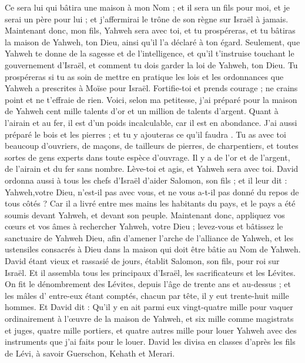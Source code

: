\begin{multicols}{2}
Ce sera lui qui bâtira une maison à mon Nom ; et il sera un fils pour moi, et je serai un père pour lui ; et j'affermirai le trône de son règne sur Israël à jamais.
Maintenant donc, mon fils, Yahweh sera avec toi, et tu prospéreras, et tu bâtiras la maison de Yahweh, ton Dieu, ainsi qu'il l’a déclaré à ton égard.
Seulement, que Yahweh te donne de la sagesse et de l'intelligence, et qu'il t'instruise touchant le gouvernement d'Israël, et comment tu dois garder la loi de Yahweh, ton Dieu.
Tu prospéreras si tu as soin de mettre en pratique les lois et les ordonnances que Yahweh a prescrites à Moïse pour Israël. Fortifie-toi et prends courage ; ne crains point et ne t'effraie de rien.
Voici, selon ma petitesse, j'ai préparé pour la maison de Yahweh cent mille talents d'or et un million de talents d'argent. Quant à l'airain et au fer, il est d'un poids incalculable, car il est en abondance. J'ai aussi préparé le bois et les pierres ; et tu y ajouteras ce qu'il faudra .
Tu as avec toi beaucoup d'ouvriers, de maçons, de tailleurs de pierres, de charpentiers, et toutes sortes de gens experts dans toute espèce d’ouvrage.
Il y a de l'or et de l'argent, de l'airain et du fer sans nombre. Lève-toi et agis, et Yahweh sera avec toi.
David ordonna aussi à tous les chefs d'Israël d'aider Salomon, son fils ; et il leur dit :
Yahweh,votre Dieu, n'est-il pas avec vous, et ne vous a-t-il pas donné du repos de tous côtés ? Car il a livré entre mes mains les habitants du pays, et le pays a été soumis devant Yahweh, et devant son peuple.
Maintenant donc, appliquez vos cœurs et vos âmes à rechercher Yahweh, votre Dieu ; levez-vous et bâtissez le sanctuaire de Yahweh Dieu, afin d’amener l’arche de l'alliance de Yahweh, et les ustensiles consacrés à Dieu dans la maison qui doit être bâtie au Nom de Yahweh.
\VerseOne{}David étant vieux et rassasié de jours, établit Salomon, son fils, pour roi sur Israël.
Et il assembla tous les principaux d'Israël, les sacrificateurs et les Lévites.
On fit le dénombrement des Lévites, depuis l'âge de trente ans et au-dessus ; et les mâles d' entre-eux étant comptés, chacun par tête, il y eut trente-huit mille hommes.
Et David dit : Qu’il y en ait  parmi eux vingt-quatre mille pour vaquer ordinairement à l'œuvre de la maison de Yahweh, et six mille comme  magistrats et juges,
quatre mille portiers, et quatre autres mille pour louer Yahweh avec des instruments que j'ai faits pour le louer.
David les divisa en classes d'après les fils de Lévi, à savoir Guerschon, Kehath et Merari.

\end{multicols}
